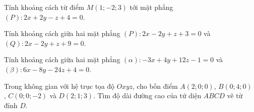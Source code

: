 \begin{bt}%
Tính khoảng cách từ điểm $M(1;-2;3)$ tới mặt phẳng $(P)\colon 2x+2y-z+4=0$.
\end{bt}

\begin{bt}%
	Tính khoảng cách giữa hai mặt phẳng $(P)\colon 2x-2y+z+3=0$ và $(Q)\colon 2x-2y+z+9=0$.
\end{bt}

\begin{bt}%
	Tính khoảng cách giữa hai mặt phẳng $(\alpha)\colon -3x+4y+12z-1=0$ và $(\beta)\colon 6x-8y-24z+4=0$.
\end{bt}

\begin{bt}%
	Trong không gian với hệ trục tọa độ $Oxyz$, cho bốn điểm $A(2;0;0)$, $B(0;4;0)$, $C(0;0;-2)$ và $D(2;1;3)$. Tìm độ dài đường cao của tứ diện $ABCD$ vẽ từ đỉnh $D$.
\end{bt}

